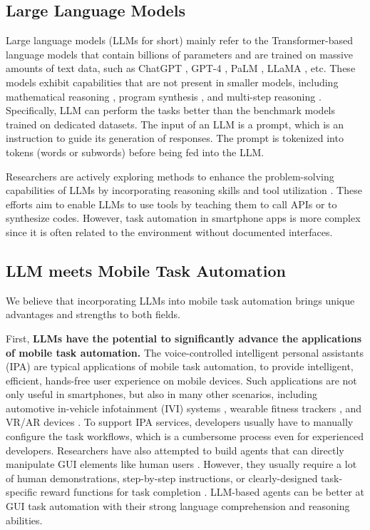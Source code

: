 \subsection{Large Language Models}
Large language models (LLMs for short) mainly refer to the Transformer-based \cite{transformer} language models that contain billions of parameters and are trained on massive amounts of text data, such as ChatGPT \cite{chatgpt}, GPT-4 \cite{openai2023gpt4}, PaLM \cite{palm}, LLaMA \cite{touvron2023llama}, etc. 
These models exhibit capabilities that are not present in smaller models, 
including mathematical reasoning \cite{solve_math}, program synthesis \cite{copilot}, and multi-step reasoning \cite{cot}. Specifically, LLM can perform the tasks better than the benchmark models trained on dedicated datasets. 
The input of an LLM is a prompt, which is an instruction to guide its generation of responses. The prompt is tokenized into tokens (words or subwords) before being fed into the LLM.

Researchers are actively exploring methods to enhance the problem-solving capabilities of LLMs by incorporating reasoning skills \cite{cot} and tool utilization \cite{chamelon, gorilla, responsible_task_automation}. These efforts aim to enable LLMs to use tools by teaching them to call APIs or to synthesize codes. However, task automation in smartphone apps is more complex since it is often related to the environment without documented interfaces. 

\subsection{LLM meets Mobile Task Automation}

We believe that incorporating LLMs into mobile task automation brings unique advantages and strengths to both fields.

First, \textbf{LLMs have the potential to significantly advance the applications of mobile task automation.}
The voice-controlled intelligent personal assistants (IPA) are typical applications of mobile task automation,  to provide intelligent, efficient, hands-free user experience on mobile devices.
Such applications are not only useful in smartphones, but also in many other scenarios, including automotive in-vehicle infotainment (IVI) systems \cite{IVIsys}, wearable fitness trackers \cite{uiwear, iself}, and VR/AR devices \cite{AMash}.
To support IPA services, developers usually have to manually configure the task workflows, which is a cumbersome process even for experienced developers.
Researchers have also attempted to build agents that can directly manipulate GUI elements like human users \cite{seq2act, metagui, kite, talking_with_ui}. 
However, they usually require a lot of human demonstrations, step-by-step instructions, or clearly-designed task-specific reward functions for task completion \cite{rl_use_computer, glider}. %
LLM-based agents can be better at GUI task automation with their strong language comprehension and reasoning abilities.

